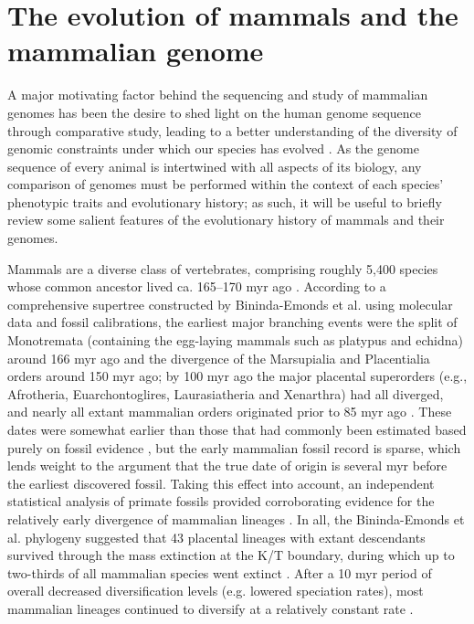\section{The evolution of mammals and the mammalian genome}

A major motivating factor behind the sequencing and study of mammalian
genomes has been the desire to shed light on the human genome sequence
through comparative study, leading to a better understanding of the
diversity of genomic constraints under which our species has evolved
\citep{LindbladToh2011}. As the genome sequence of every animal is
intertwined with all aspects of its biology, any comparison of genomes
must be performed within the context of each species' phenotypic
traits and evolutionary history; as such, it will be useful to briefly
review some salient features of the evolutionary history of mammals
and their genomes.

Mammals are a diverse class of vertebrates, comprising roughly 5,400
species whose common ancestor lived ca. 165--170 \ac{myr} ago
\citep{Wilson2005}. According to a comprehensive supertree constructed
by Bininda-Emonds et al. using molecular data and fossil calibrations,
the earliest major branching events were the split of Monotremata
(containing the egg-laying mammals such as platypus and echidna)
around 166 \ac{myr} ago and the divergence of the Marsupialia and
Placentialia orders around 150 \ac{myr} ago; by 100 \ac{myr} ago the
major placental superorders (e.g., Afrotheria, Euarchontoglires,
Laurasiatheria and Xenarthra) had all diverged, and nearly all extant
mammalian orders originated prior to 85 \ac{myr} ago
\citep{BinindaEmonds2007}. These dates were somewhat earlier than
those that had commonly been estimated based purely on fossil evidence
\citep{Archibald2001}, but the early mammalian fossil record is
sparse, which lends weight to the argument that the true date of
origin is several \ac{myr} before the earliest discovered
fossil. Taking this effect into account, an independent statistical
analysis of primate fossils provided corroborating evidence for the
relatively early divergence of mammalian lineages
\citep{Martin2007}. In all, the Bininda-Emonds et al. phylogeny
suggested that 43 placental lineages with extant descendants survived
through the mass extinction at the K/T boundary, during which up to
two-thirds of all mammalian species went extinct
\citep{Alroy1999}. After a 10 \ac{myr} period of overall decreased
diversification levels (e.g. lowered speciation rates), most mammalian
lineages continued to diversify at a relatively constant rate
\citep{BinindaEmonds2007,Martin2007}.

